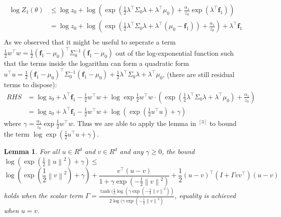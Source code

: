\documentclass{article}
\newtheorem{lemma}{Lemma}
\begin{document}
 \begin{equation}
  \begin{aligned}
   \log Z_{1}(\theta ) &\leq \log z_0 + \log (\exp(\frac{1}{2} \lambda^{\top} \Sigma_0 \lambda + \lambda^{\top} \mu_0) + \frac{\alpha_1}{z_0} \exp(\lambda^{\top}\textbf{f}_1)) \nonumber \\
    & = \log z_0 + \log (\exp(\frac{1}{2} \lambda^{\top} \Sigma_0 \lambda + \lambda^{\top} (\mu_0 - \textbf{f}_1)) + \frac{\alpha_1}{z_0} ) + \lambda^{\top}\textbf{f}_1  \nonumber \\
   \label{inequality3}
  \end{aligned}
 \end{equation}
 As we observed that it might be useful to seperate a term $\frac{1}{2}w^{\top}w = \frac{1}{2} (\textbf{f}_1 - \mu_0)^{\top} \Sigma_0^{-1} (\textbf{f}_1 - \mu_0)$ out of the log-exponential function
 such that the terms inside the logarithm can form a quadratic form $u^{\top} u = \frac{1}{2} (\textbf{f}_1 - \mu_0)^{\top} \Sigma_0^{-1} (\textbf{f}_1 - \mu_0) + \frac{1}{2} \lambda^{\top} \Sigma_0 \lambda + \lambda^{\top} \mu_0$, (there are still residual terms to dispose):
 \begin{equation}
  \begin{aligned}
   RHS & = \log z_0 +  \lambda^{\top}\textbf{f}_1 -\frac{1}{2}w^{\top}w + \log\exp \frac{1}{2}w^{\top}w \cdot (\exp(\frac{1}{2} \lambda^{\top} \Sigma_0 \lambda + \lambda^{\top} \mu_0) + \frac{\alpha_1}{z_0}) \\
       & = \log z_0 + \lambda^{\top}\textbf{f}_1 -\frac{1}{2}w^{\top}w + \log (\exp(\frac{1}{2} u^{\top} u) + \gamma)
  \label{inequality4}
  \end{aligned}
 \end{equation}
 where $\gamma = \frac{\alpha_1}{z_0} \exp \frac{1}{2}w^{\top}w$. Thus we are able to apply the lemma in $^{[3]}$ to bound the term $\log \exp(\frac{1}{2} u^{\top} u + \gamma)$.

 \begin{lemma}
  For all $u\in R^d$ and $v\in R^d$ and any $\gamma \geq 0$, the bound $\log(\exp(\frac{1}{2}\left\lVert u \right\lVert^2) + \gamma) \leq $
  \begin{equation}
    \log(\exp(\frac{1}{2}\left\lVert v \right\lVert^2) + \gamma) + \frac{ v^{\top} (u- v)}{1 + \gamma \exp(-\frac{1}{2}\left\lVert v \right\lVert^2)} + \frac{1}{2}(u-v)^{\top} (I + \Gamma vv^{\top})(u-v)         \nonumber
  \end{equation}
  holds when the scalar term $\Gamma = \frac{\tanh(\frac{1}{2}\log(\gamma \exp(-\frac{1}{2}\left\lVert v \right\lVert^2))}{2\log(\gamma \exp(-\frac{1}{2}\left\lVert v \right\lVert^2)}$, equality is achieved when $u = v$.
 \label{lemma1}
\end{lemma}
\end{document}
